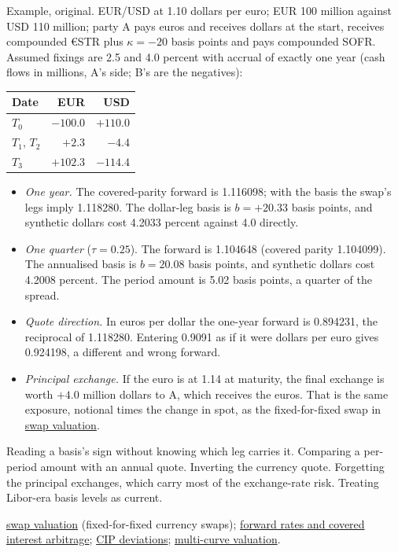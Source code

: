 \begin{qfmethod}
 Example, original. EUR/USD at 1.10 dollars per euro; EUR 100 million against USD 110 million; party A pays euros and receives dollars at the start, receives compounded €STR plus $\kappa=-20$ basis points and pays compounded SOFR. Assumed fixings are 2.5 and 4.0 percent with accrual of exactly one year (cash flows in millions, A's side; B's are the negatives):
\begin{center}
\begin{tabular}{@{}lrr@{}}
\toprule
Date & EUR & USD \\
\midrule
$T_0$ & $-100.0$ & $+110.0$ \\
$T_1$, $T_2$ & $+2.3$ & $-4.4$ \\
$T_3$ & $+102.3$ & $-114.4$ \\
\bottomrule
\end{tabular}
\end{center}
\begin{itemize}
\item \emph{One year.} The covered-parity forward is 1.116098; with the basis the swap's legs imply 1.118280. The dollar-leg basis is $b=+20.33$ basis points, and synthetic dollars cost 4.2033 percent against 4.0 directly.
\item \emph{One quarter} ($\tau=0.25$). The forward is 1.104648 (covered parity 1.104099). The annualised basis is $b=20.08$ basis points, and synthetic dollars cost 4.2008 percent. The period amount is 5.02 basis points, a quarter of the spread.
\item \emph{Quote direction.} In euros per dollar the one-year forward is 0.894231, the reciprocal of 1.118280. Entering 0.9091 as if it were dollars per euro gives 0.924198, a different and wrong forward.
\item \emph{Principal exchange.} If the euro is at 1.14 at maturity, the final exchange is worth $+4.0$ million dollars to A, which receives the euros. That is the same exposure, notional times the change in spot, as the fixed-for-fixed swap in \hyperref[meth:swap-valuation-replication]{swap valuation}.
\end{itemize}

 Reading a basis's sign without knowing which leg carries it. Comparing a per-period amount with an annual quote. Inverting the currency quote. Forgetting the principal exchanges, which carry most of the exchange-rate risk. Treating Libor-era basis levels as current.

 \hyperref[meth:swap-valuation-replication]{swap valuation} (fixed-for-fixed currency swaps); \hyperref[meth:cross-forward-rates]{forward rates and covered interest arbitrage}; \hyperref[ev:cip-deviations]{CIP deviations}; \hyperref[mod:multi-curve-fra-swap-valuation]{multi-curve valuation}.

\end{qfmethod}

